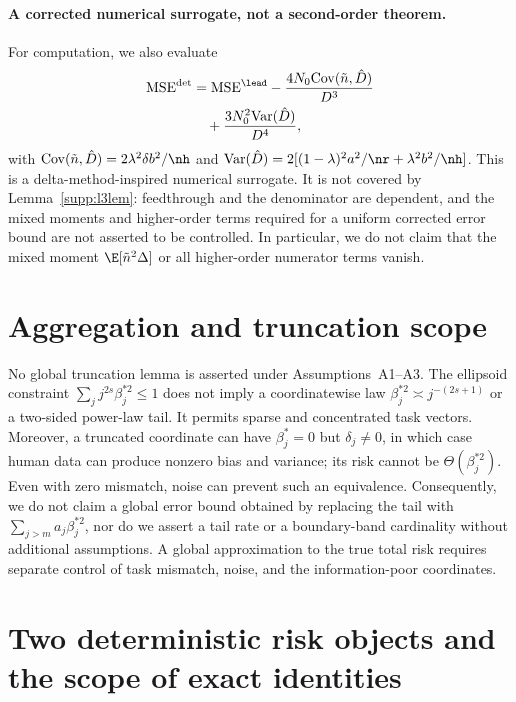 \paragraph{A corrected numerical surrogate, not a second-order theorem.}
For computation, we also evaluate
\begin{align}
  \mathrm{MSE}^{\det}
  &= \mathrm{MSE}^{\lead}
  -\frac{4N_0\mathrm{Cov}(\tilde n,\hat D)}{D^3} \notag\\
  &\quad+\frac{3N_0^2\mathrm{Var}(\hat D)}{D^4},
  \label{supp:eq:msedet}
\end{align}
with $\mathrm{Cov}(\tilde n,\hat D)=2\lambda^2\delta b^2/\nh$ and $\mathrm{Var}(\hat D)=2[(1-\lambda)^2a^2/\nr+\lambda^2b^2/\nh]$. This is a delta-method-inspired numerical surrogate. It is not covered by Lemma~\ref{supp:l3lem}: feedthrough and the denominator are dependent, and the mixed moments and higher-order terms required for a uniform corrected error bound are not asserted to be controlled. In particular, we do not claim that the mixed moment $\E[\tilde n^2\Delta]$ or all higher-order numerator terms vanish.

\section{Aggregation and truncation scope}
\label{supp:l4}

No global truncation lemma is asserted under Assumptions~A1--A3. The ellipsoid constraint $\sum_j j^{2s}\beta_j^{*2}\le1$ does not imply a coordinatewise law $\beta_j^{*2}\asymp j^{-(2s+1)}$ or a two-sided power-law tail. It permits sparse and concentrated task vectors.
Moreover, a truncated coordinate can have $\beta_j^*=0$ but $\delta_j\ne0$, in which case human data can produce nonzero bias and variance; its risk cannot be $\Theta(\beta_j^{*2})$. Even with zero mismatch, noise can prevent such an equivalence.
Consequently, we do not claim a global error bound obtained by replacing the tail with $\sum_{j>m}a_j\beta_j^{*2}$, nor do we assert a tail rate or a boundary-band cardinality without additional assumptions. A global approximation to the true total risk requires separate control of task mismatch, noise, and the information-poor coordinates.

\section{Two deterministic risk objects and the scope of exact identities}
\label{supp:riskobjects}


